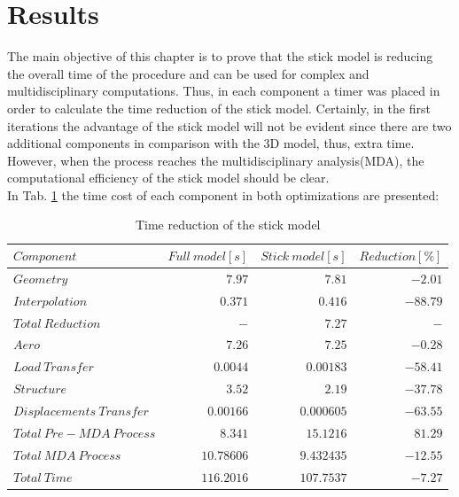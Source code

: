 \section{Results}
The main objective of this chapter is to prove that the stick model is reducing the overall time of the procedure and can be used for complex and multidisciplinary computations. Thus, in each component a timer was placed in order to calculate the time reduction of the stick model. Certainly, in the first iterations the advantage of the stick model will not be evident since there are two additional components in comparison with the 3D model, thus, extra time. However, when the process reaches the multidisciplinary analysis(MDA), the computational efficiency of the stick model should be clear. \cite{bru}\\
In Tab. \ref{tab:t3} the time cost of each component in both optimizations are presented:
\begin{table}
	\begin{tabular}{l|rr|r}
		\toprule
		$Component $  &  $Full\  model [s]$  &  $Stick\  model [s]$ & $Reduction [\%]$ \\
		\midrule
		$Geometry$  &  $7.97$  &  $7.81$ & $ -2.01$\\
		$Interpolation$  &  $0.371$  &  $0.416$ & $ -88.79 $\\
		$Total\  Reduction$  &  $-$  &  $7.27$  &$  -$\\
		$Aero$  &  $7.26$  &  $7.25$ &$ -0.28$  \\
		$Load\  Transfer$  &  $0.0044$  &  $0.00183$  &$ -58.41 $\\
		$Structure$  &  $3.52$  &  $2.19$  &$ -37.78$\\
		$Displacements \ Transfer$  &  $0.00166$  &  $0.000605$  &$ -63.55   $\\
		$Total\ Pre-MDA \ Process$  &  $8.341$  &  $15.1216$  &$81.29 $\\
		$Total\ MDA\ Process$  &  $10.78606$  &  $9.432435$  &$-12.55  $\\
		$Total\ Time$  &  $116.2016$  & $107.7537$ &$-7.27$ \\
		\bottomrule
	\end{tabular}
	\caption{Time reduction of the stick model}
	\label{tab:t3}
\end{table} 







